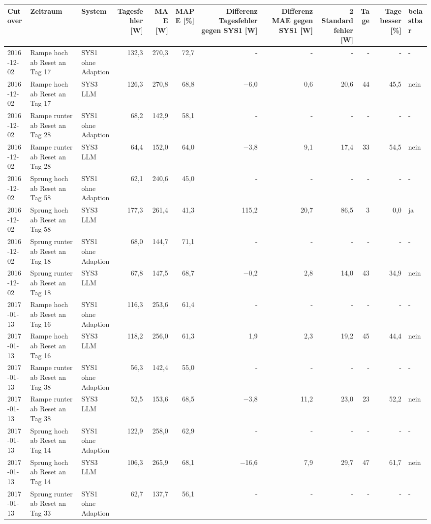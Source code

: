 \begin{tabular}{lllrrrrrrrrl}
\toprule
Cutover & Zeitraum & System & Tagesfehler [W] & MAE [W] & MAPE [\%] & Differenz Tagesfehler gegen SYS1 [W] & Differenz MAE gegen SYS1 [W] & 2 Standardfehler [W] & Tage & Tage besser [\%] & belastbar \\
\midrule
2016-12-02 & Rampe hoch ab Reset an Tag 17 & SYS1 ohne Adaption & 132,3 & 270,3 & 72,7 & - & - & - & - & - & - \\
2016-12-02 & Rampe hoch ab Reset an Tag 17 & SYS3 LLM & 126,3 & 270,8 & 68,8 & $-$6,0 & 0,6 & 20,6 & 44 & 45,5 & nein \\
2016-12-02 & Rampe runter ab Reset an Tag 28 & SYS1 ohne Adaption & 68,2 & 142,9 & 58,1 & - & - & - & - & - & - \\
2016-12-02 & Rampe runter ab Reset an Tag 28 & SYS3 LLM & 64,4 & 152,0 & 64,0 & $-$3,8 & 9,1 & 17,4 & 33 & 54,5 & nein \\
2016-12-02 & Sprung hoch ab Reset an Tag 58 & SYS1 ohne Adaption & 62,1 & 240,6 & 45,0 & - & - & - & - & - & - \\
2016-12-02 & Sprung hoch ab Reset an Tag 58 & SYS3 LLM & 177,3 & 261,4 & 41,3 & 115,2 & 20,7 & 86,5 & 3 & 0,0 & ja \\
2016-12-02 & Sprung runter ab Reset an Tag 18 & SYS1 ohne Adaption & 68,0 & 144,7 & 71,1 & - & - & - & - & - & - \\
2016-12-02 & Sprung runter ab Reset an Tag 18 & SYS3 LLM & 67,8 & 147,5 & 68,7 & $-$0,2 & 2,8 & 14,0 & 43 & 34,9 & nein \\
2017-01-13 & Rampe hoch ab Reset an Tag 16 & SYS1 ohne Adaption & 116,3 & 253,6 & 61,4 & - & - & - & - & - & - \\
2017-01-13 & Rampe hoch ab Reset an Tag 16 & SYS3 LLM & 118,2 & 256,0 & 61,3 & 1,9 & 2,3 & 19,2 & 45 & 44,4 & nein \\
2017-01-13 & Rampe runter ab Reset an Tag 38 & SYS1 ohne Adaption & 56,3 & 142,4 & 55,0 & - & - & - & - & - & - \\
2017-01-13 & Rampe runter ab Reset an Tag 38 & SYS3 LLM & 52,5 & 153,6 & 68,5 & $-$3,8 & 11,2 & 23,0 & 23 & 52,2 & nein \\
2017-01-13 & Sprung hoch ab Reset an Tag 14 & SYS1 ohne Adaption & 122,9 & 258,0 & 62,9 & - & - & - & - & - & - \\
2017-01-13 & Sprung hoch ab Reset an Tag 14 & SYS3 LLM & 106,3 & 265,9 & 68,1 & $-$16,6 & 7,9 & 29,7 & 47 & 61,7 & nein \\
2017-01-13 & Sprung runter ab Reset an Tag 33 & SYS1 ohne Adaption & 62,7 & 137,7 & 56,1 & - & - & - & - & - & - \\

\end{tabular}
